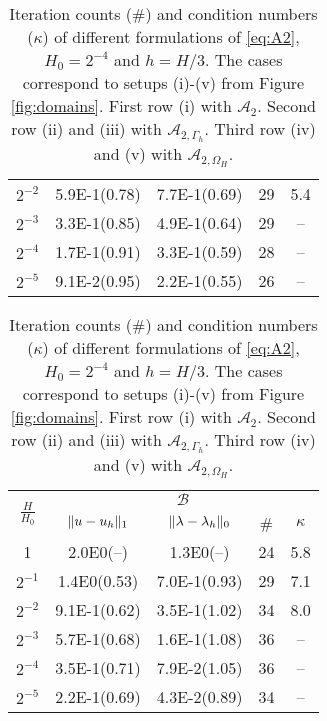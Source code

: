 \begin{table}
{\begin{minipage}{0.49\textwidth}
\begin{center}
\begin{tabular}{c|cccc}
$2^{-2}$ & 5.9E-1(0.78) & 7.7E-1(0.69) & 29 &5.4\\
$2^{-3}$ & 3.3E-1(0.85) & 4.9E-1(0.64) & 29 &-- \\
$2^{-4}$ & 1.7E-1(0.91) & 3.3E-1(0.59) & 28 &-- \\
$2^{-5}$ & 9.1E-2(0.95) & 2.2E-1(0.55) & 26 &-- \\
      \hline
  \end{tabular}
  \end{center}
  \end{minipage}
  }
  \scriptsize{%
    \begin{minipage}{0.49\textwidth}
  \begin{center}
    \begin{tabular}{c|cccc}
      \hline
      \multirow{2}{*}{$\frac{H}{H_0}$} & \multicolumn{4}{c}{$\mathcal{B}$}\\
      \cline{2-5}
      & $\lVert{u-u_h}\rVert_1$ & $\lVert{\lambda-\lambda_h}\rVert_0$ & \# & $\kappa$\\
      \hline
1       & 2.0E0(--) & 1.3E0(--)        & 24 & 5.8\\
$2^{-1}$ & 1.4E0(0.53) & 7.0E-1(0.93)   & 29 & 7.1\\
$2^{-2}$ & 9.1E-1(0.62) & 3.5E-1(1.02)  & 34 & 8.0\\
$2^{-3}$ & 5.7E-1(0.68) & 1.6E-1(1.08)  & 36 & -- \\
$2^{-4}$ & 3.5E-1(0.71) & 7.9E-2(1.05)  & 36 & -- \\
$2^{-5}$ & 2.2E-1(0.69) & 4.3E-2(0.89)  & 34 & -- \\
      \hline
  \end{tabular}
  \end{center}
  \end{minipage}
  }
  \caption{Iteration counts (\#) and condition numbers ($\kappa$) of different
    formulations of \eqref{eq:A2}, $H_0=2^{-4}$ and $h=H/3$.
    The cases correspond to setups (i)-(v) from Figure \ref{fig:domains}.
    First row (i) with $\mathcal{A}_2$. Second row (ii) and (iii) with
    $\mathcal{A}_{2, \Gamma_h}$. Third row (iv) and (v) with $\mathcal{A}_{2, \Omega_H}$.
  }
  \label{tab:A2}
\end{table}

